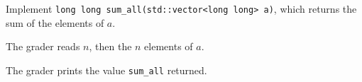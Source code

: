 Implement \texttt{long long sum\_all(std::vector<long long> a)}, which returns the
sum of the elements of $a$.

The grader reads $n$, then the $n$ elements of $a$.

The grader prints the value \texttt{sum\_all} returned.
